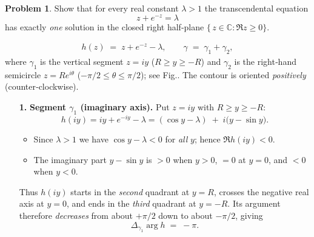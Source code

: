 \documentclass[12pt]{article}
\theoremstyle{definition} %
\newtheorem{problem}{Problem}
\theoremstyle{plain} %
\begin{document}
\begin{problem}
    Show that for every real constant $\lambda>1$ the transcendental equation
    \[
        z+e^{-z}=\lambda
    \]
    has exactly \emph{one} solution in the closed right half‑plane
    $\{\,z\in\mathbb C:\Re z\ge0\}$.

    \begin{align}
        h(z)\;=\;z+e^{-z}-\lambda, \qquad 
        \gamma\;=\;\gamma_1+\gamma_2,
    \end{align}
    where $\gamma_1$ is the vertical segment $z=iy$ ($R\ge y\ge -R$) and  
    $\gamma_2$ is the right‑hand semicircle $z=Re^{i\theta}$ ($-\pi/2\le\theta\le\pi/2$);  
    see Fig..  The contour is oriented \emph{positively} (counter‑clockwise).

    \begin{enumerate}
    \item[\textbf{1.}] \textbf{Segment $\gamma_1$ (imaginary axis).}\;
          Put $z=iy$ with $R\ge y\ge -R$:
          \[
              h(iy)=iy+e^{-iy}-\lambda
                    =(\cos y-\lambda)\;+\;i\bigl(y-\sin y\bigr).
          \]
          \begin{itemize}
              \item Since $\lambda>1$ we have $\cos y-\lambda<0$ for \emph{all} $y$;
                    hence $\Re h(iy)<0$.
              \item The imaginary part $y-\sin y$ is $>0$ when $y>0$,
                    $=0$ at $y=0$, and $<0$ when $y<0$.
          \end{itemize}
          Thus $h(iy)$ starts in the \emph{second} quadrant at $y=R$,
          crosses the negative real axis at $y=0$,
          and ends in the \emph{third} quadrant at $y=-R$.
          Its argument therefore \emph{decreases} from about $+\pi/2$
          down to about $-\pi/2$, giving
          \[
              \Delta_{\gamma_1}\arg h \;=\; -\pi.
          \]


\end{enumerate}
\end{problem}
\end{document}
